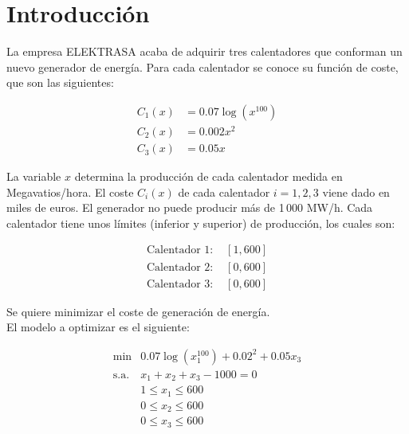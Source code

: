 \documentclass[12pt,a4paper,twoside,openright,titlepage,final]{article}
\author{José Ignacio Escribano}
\title{}
\begin{document}
\setcounter{page}{1}


\listoffigures
\thispagestyle{empty}
\newpage

\listoftables
\thispagestyle{empty}
\newpage

\tableofcontents
\thispagestyle{empty}
\newpage


\setcounter{page}{1}

\section{Introducción}

La empresa ELEKTRASA acaba de adquirir tres calentadores que conforman un nuevo generador de energía. Para cada calentador se conoce su función de coste, que son las siguientes:

\begin{eqnarray*}
C_1(x)  & =  0.07\log(x^{100}) \\
C_2(x) & =  0.002x^2 \\
C_3(x) & =  0.05x
\end{eqnarray*}

La variable $x$ determina la producción de cada calentador medida en Megavatios/hora. El coste $C_i(x)$ de cada calentador $i=1,2,3$ viene dado en miles de euros. El generador no puede producir más de 1\,000 MW/h. Cada calentador tiene unos límites (inferior y superior) de producción, los cuales son:

\begin{eqnarray*}
\text{Calentador 1: } & [1, 600] \\
\text{Calentador 2: } & [0, 600] \\
\text{Calentador 3: } & [0, 600]
\end{eqnarray*}

Se quiere minimizar el coste de generación de energía.\\

El modelo a optimizar es el siguiente:

\begin{align*}
\mathrm{min} & 0.07\log(x_1^{100}) + 0.02^2 + 0.05x_3\\
\text{s.a.}  & x_1 + x_2 + x_3 - 1000 = 0 \\
             & 1 \leq x_1 \leq 600 \\
             & 0 \leq x_2 \leq 600 \\
             & 0 \leq x_3 \leq 600
\end{align*}
\end{document}
